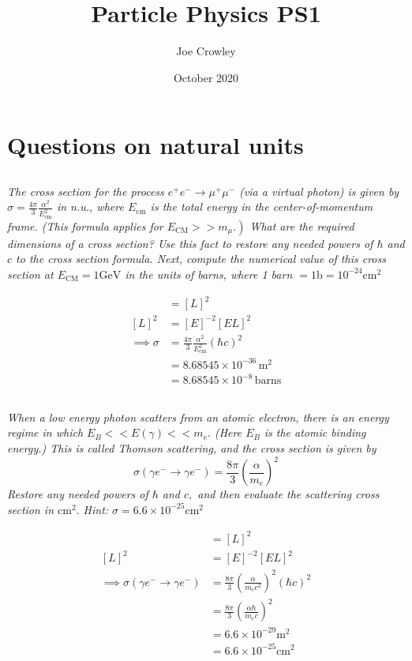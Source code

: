 \documentclass{article}
\title{Particle Physics PS1}
\author{Joe Crowley}
\date{October 2020}
\begin{document}
  


\section{Questions on natural units}

\subsection{}
\textit{The cross section for the process $e^{+} e^{-} \rightarrow \mu^{+} \mu^{-}$ (via a virtual photon) is given by $\sigma=\frac{4 \pi}{3} \frac{\alpha^{2}}{E_{\mathrm{cm}}^{2}}$ in n.u., where $E_{\mathrm{cm}}$ is the total energy in the center-of-momentum frame. (This formula applies for $\left.E_{\mathrm{CM}}>>m_{\mu} .\right)$ What are the required dimensions of a cross section? Use this fact to restore any needed powers of $\hbar$ and $c$ to the cross section formula. Next, compute the numerical value of this cross section at $E_{\mathrm{CM}}=1 \mathrm{GeV}$ in the units of barns, where 1 barn $=1 \mathrm{b}=10^{-24} \mathrm{cm}^{2}$}

\begin{align*}
    [\sigma]&=[L]^{2}\\
    [L]^2 &= [E]^{-2}[E L ]^2\\
    \implies \sigma &= \frac{4 \pi}{3} \frac{\alpha^{2}}{E_{\mathrm{cm}}^{2}} (\hbar c)^2\\
    &= 8.68545 \times 10^{-36} \, \mathrm{m}^{2}\\
    &= 8.68545 \times 10^{-8} \,\mathrm{barns}
\end{align*}


\subsection{}
\textit{When a low energy photon scatters from an atomic electron, there is an energy regime in which $E_{B}<<E(\gamma)<<m_{e} .$ (Here $E_{B}$ is the atomic binding energy.) This is called Thomson scattering, and the cross section is given by
$$
\sigma\left(\gamma e^{-} \rightarrow \gamma e^{-}\right)=\frac{8 \pi}{3}\left(\frac{\alpha}{m_{e}}\right)^{2}
$$
Restore any needed powers of $\hbar$ and $c,$ and then evaluate the scattering cross section in $\mathrm{cm}^{2} .$ Hint: $\sigma=6.6 \times 10^{-25} \mathrm{cm}^{2}$}

\begin{align*}
    [\sigma]&=[L]^{2}\\
    [L]^2 &= [E]^{-2}[E L ]^2\\
    \implies \sigma\left(\gamma e^{-} \rightarrow \gamma e^{-}\right)&=\frac{8 \pi}{3}\left(\frac{\alpha}{m_{e} c^2 }\right)^{2}  (\hbar c)^2\\
    &= \frac{8 \pi}{3}\left(\frac{\alpha \hbar}{m_{e} c}\right)^{2}\\
    &=6.6 \times 10^{-29} \mathrm{m}^{2}\\
    &=6.6 \times 10^{-25} \mathrm{cm}^{2}
\end{align*}
\end{document}
